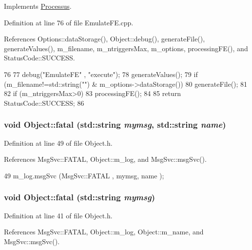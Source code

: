 Implements \hyperlink{classProcessus_a63767a63a1fb0055c5aa45b21a4a5d58}{Processus}.

Definition at line 76 of file EmulateFE.cpp.

References Options::dataStorage(), Object::debug(), generateFile(), generateValues(), m\_\-filename, m\_\-ntriggersMax, m\_\-options, processingFE(), and StatusCode::SUCCESS.


\begin{DoxyCode}
76                                 {
77   debug("EmulateFE" , "execute");
78   generateValues();
79   if (m_filename!=std::string("") & m_options->dataStorage()){
80     generateFile();
81   }
82   if (m_ntriggersMax>0){
83     processingFE();
84   }
85   return StatusCode::SUCCESS;
86 }
\end{DoxyCode}
\hypertarget{classObject_ae62acd3d09f716220f75f252dc38bc9a}{
\subsubsection[{fatal}]{\setlength{\rightskip}{0pt plus 5cm}void Object::fatal (std::string {\em mymsg}, \/  std::string {\em name})}}
\label{classObject_ae62acd3d09f716220f75f252dc38bc9a}


Definition at line 49 of file Object.h.

References MsgSvc::FATAL, Object::m\_\-log, and MsgSvc::msgSvc().


\begin{DoxyCode}
49 { m_log.msgSvc (MsgSvc::FATAL   , mymsg, name ); }
\end{DoxyCode}
\hypertarget{classObject_aad5a16aac7516ce65bd5ec02ab07fc80}{
\subsubsection[{fatal}]{\setlength{\rightskip}{0pt plus 5cm}void Object::fatal (std::string {\em mymsg})}}
\label{classObject_aad5a16aac7516ce65bd5ec02ab07fc80}


Definition at line 41 of file Object.h.

References MsgSvc::FATAL, Object::m\_\-log, Object::m\_\-name, and MsgSvc::msgSvc().

